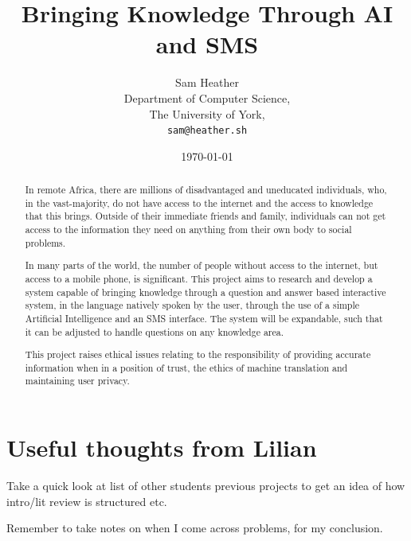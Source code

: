 \documentclass{article}
\begin{document}
\title{Bringing Knowledge Through AI and SMS}
\author{Sam Heather\\
  Department of Computer Science,\\
  The University of York,\\
  \texttt{sam@heather.sh}}
\date{\today}
\maketitle

\newpage

\begin{abstract}


In remote Africa, there are millions of disadvantaged and  uneducated individuals, who, in the vast-majority, do not have access to the internet and the access to knowledge that this brings.  Outside of their immediate friends and family, individuals can not get access to the information they need on anything from their own body to social problems.

In many parts of the world, the number of people without access to the internet, but access to a mobile phone, is significant.  This project aims to research and develop a system capable of bringing knowledge through a question and answer based interactive system, in the language natively spoken by the user, through the use of a simple Artificial Intelligence and an SMS interface.  The system will be expandable, such that it can be adjusted to handle questions on any knowledge area.

This project raises ethical issues relating to the responsibility of providing accurate information when in a position of trust, the ethics of machine translation and maintaining user privacy.
\end{abstract}

\newpage
\tableofcontents
\newpage
\listoffigures
\newpage
\listoftables
\newpage

\section{Useful thoughts from Lilian}
Take a quick look at list of other students previous projects to get an idea of how intro/lit review is structured etc.

Remember to take notes on when I come across problems, for my conclusion.
\end{document}
